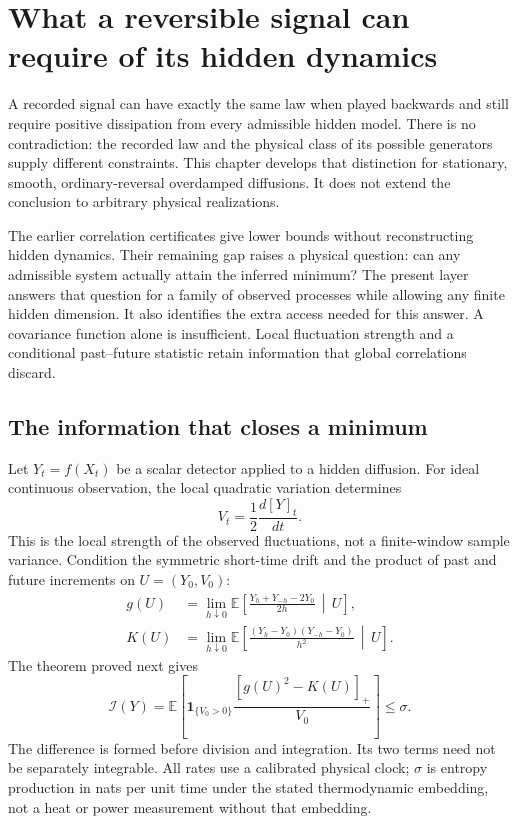 \chapter{What a reversible signal can require of its hidden dynamics}
\label{og:entry}

A recorded signal can have exactly the same law when played backwards and
still require positive dissipation from every admissible hidden model.
There is no contradiction: the recorded law and the physical class of its
possible generators supply different constraints. This chapter develops that
distinction for stationary, smooth, ordinary-reversal overdamped diffusions.
It does not extend the conclusion to arbitrary physical realizations.

The earlier correlation certificates give lower bounds without reconstructing
hidden dynamics. Their remaining gap raises a physical question: can any
admissible system actually attain the inferred minimum? The present layer
answers that question for a family of observed processes while allowing any
finite hidden dimension. It also identifies the extra access needed for this
answer. A covariance function alone is insufficient. Local fluctuation
strength and a conditional past--future statistic retain information that
global correlations discard.

\section{The information that closes a minimum}
Let $Y_t=f(X_t)$ be a scalar detector applied to a hidden diffusion. For ideal
continuous observation, the local quadratic variation determines
\[
 V_t=\frac12\frac{d[Y]_t}{dt}.
\]
This is the local strength of the observed fluctuations, not a finite-window
sample variance. Condition the symmetric short-time drift and the product of
past and future increments on $U=(Y_0,V_0)$:
\begin{align*}
 g(U)&=\lim_{h\downarrow0}
   \mathbb E\!\left[\frac{Y_h+Y_{-h}-2Y_0}{2h}\,\middle|\,U\right],\\
 K(U)&=\lim_{h\downarrow0}
   \mathbb E\!\left[\frac{(Y_h-Y_0)(Y_{-h}-Y_0)}{h^2}
                 \,\middle|\,U\right].
\end{align*}
The theorem proved next gives
\[
 \mathcal I(Y)=
 \mathbb E\!\left[\mathbf 1_{\{V_0>0\}}
            \frac{[g(U)^2-K(U)]_+}{V_0}\right]\leq\sigma.
\]
The difference is formed before division and integration. Its two terms need
not be separately integrable. All rates use a calibrated physical clock;
$\sigma$ is entropy production in nats per unit time under the stated
thermodynamic embedding, not a heat or power measurement without that embedding.

